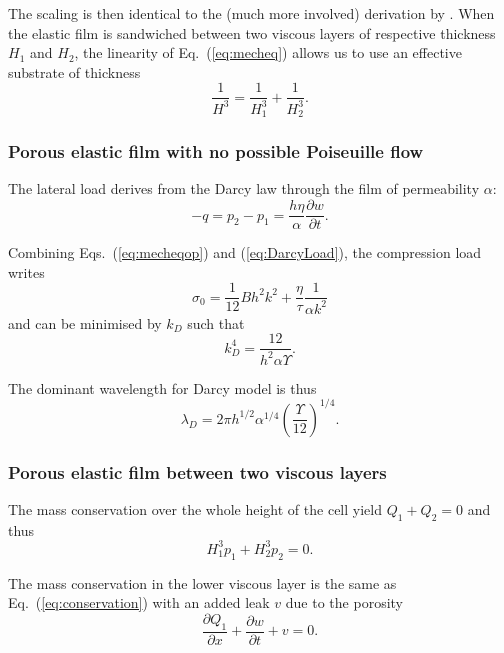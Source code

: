 \documentclass[twocolumn,superscriptaddress,showpacs,preprintnumbers,
amsmath,amssymb,prl]{revtex4-1}
\begin{document}
The scaling is then identical to the (much more involved) derivation by \citet{Huang2002}. When the elastic film is sandwiched between two viscous layers of respective thickness $H_1$ and $H_2$, the linearity of Eq.~(\ref{eq:mecheq}) allows us to use an effective substrate of thickness 
\begin{equation}
\frac{1}{H^3} = \frac{1}{H_1^3}+\frac{1}{H_2^3}.
\end{equation}

\subsubsection*{Porous elastic film with no possible Poiseuille flow}
The lateral load derives from the Darcy law through the film of permeability $\alpha$:
\begin{equation}
-q = p_2-p_1 = \frac{h\eta}{\alpha}\frac{\partial w}{\partial t}.
\label{eq:DarcyLoad}
\end{equation}

Combining Eqs.~(\ref{eq:mecheqop}) and (\ref{eq:DarcyLoad}), the compression load writes
\begin{equation}
\sigma_0 = \frac{1}{12}B h^2 k^2 + \frac{\eta}{\tau}\frac{1}{\alpha k^2}
\label{eq:sigma0D}
\end{equation}
and can be minimised by $k_D$ such that
\begin{equation}
k_D^4 = \frac{12}{h^2\alpha\Upsilon}.
\label{eq:kD}
\end{equation}

The dominant wavelength for Darcy model is thus
\begin{equation}
\lambda_D = 2\pi h^{1/2}\alpha^{1/4}\left(\frac{\Upsilon}{12}\right)^{1/4}.
\end{equation}


\subsubsection*{Porous elastic film between two viscous layers}
The mass conservation over the whole height of the cell yield $Q_1 + Q_2 = 0$ and thus
\begin{equation}
H_1^3 p_1 + H_2^3 p_2 = 0.
\label{eq:pressures}
\end{equation}

The mass conservation in the lower viscous layer is the same as Eq.~(\ref{eq:conservation}) with an added leak $v$ due to the porosity
\begin{equation}
\frac{\partial Q_1}{\partial x} + \frac{\partial w}{\partial t} + v = 0.
\label{eq:conservationDarcy}
\end{equation}
\end{document}

